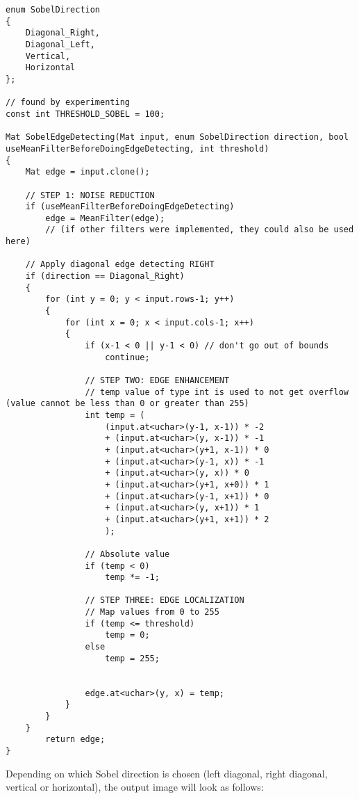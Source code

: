 \begin{lstlisting}
enum SobelDirection
{
	Diagonal_Right,
	Diagonal_Left,
	Vertical,
	Horizontal
};

// found by experimenting
const int THRESHOLD_SOBEL = 100;

Mat SobelEdgeDetecting(Mat input, enum SobelDirection direction, bool useMeanFilterBeforeDoingEdgeDetecting, int threshold)
{
	Mat edge = input.clone();

	// STEP 1: NOISE REDUCTION
	if (useMeanFilterBeforeDoingEdgeDetecting)
		edge = MeanFilter(edge);
		// (if other filters were implemented, they could also be used here)

	// Apply diagonal edge detecting RIGHT
	if (direction == Diagonal_Right)
	{
		for (int y = 0; y < input.rows-1; y++)
		{
			for (int x = 0; x < input.cols-1; x++)
			{
				if (x-1 < 0 || y-1 < 0) // don't go out of bounds
					continue;

				// STEP TWO: EDGE ENHANCEMENT
				// temp value of type int is used to not get overflow (value cannot be less than 0 or greater than 255)
				int temp = (
					(input.at<uchar>(y-1, x-1)) * -2
					+ (input.at<uchar>(y, x-1)) * -1
					+ (input.at<uchar>(y+1, x-1)) * 0
					+ (input.at<uchar>(y-1, x)) * -1
					+ (input.at<uchar>(y, x)) * 0
					+ (input.at<uchar>(y+1, x+0)) * 1
					+ (input.at<uchar>(y-1, x+1)) * 0
					+ (input.at<uchar>(y, x+1)) * 1
					+ (input.at<uchar>(y+1, x+1)) * 2
					);

				// Absolute value
				if (temp < 0)
					temp *= -1;

				// STEP THREE: EDGE LOCALIZATION
				// Map values from 0 to 255
				if (temp <= threshold)
					temp = 0;
				else
					temp = 255;
				

				edge.at<uchar>(y, x) = temp;
			}
		}
	}
		return edge;
}
\end{lstlisting}

Depending on which Sobel direction is chosen (left diagonal, right diagonal, vertical or horizontal), the output image will look as follows:


